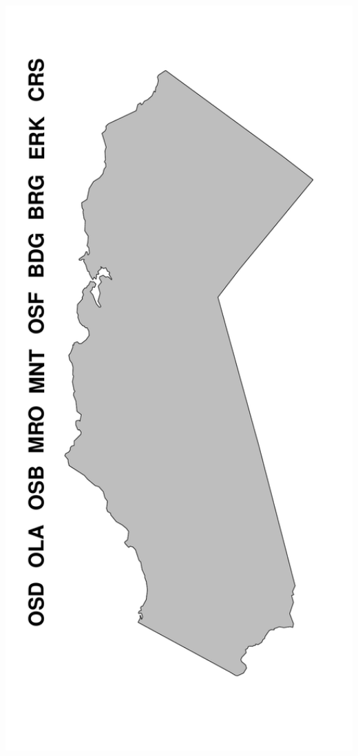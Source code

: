 \documentclass[ xcolor = pdftex, dvipsnames, table ]{beamer}
\begin{document}
\begin{frame}
{\begin{minipage}[h!]{0.19\textwidth}
     \hspace*{-0.5cm}
        \includegraphics[width=1.2\textwidth]{../pictures/mapFullBlank.pdf}

\end{minipage}}
\end{frame}
\end{document}
